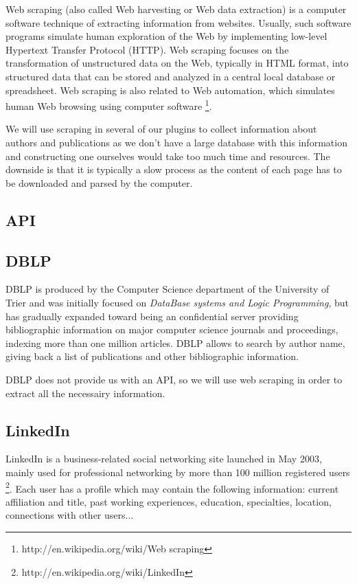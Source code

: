 Web scraping (also called Web harvesting or Web data extraction) is a computer software technique of extracting information from websites. Usually, such software programs simulate human exploration of the Web by implementing low-level Hypertext Transfer Protocol (HTTP). Web scraping focuses on the transformation of unstructured data on the Web, typically in HTML format, into structured data that can be stored and analyzed in a central local database or spreadsheet. Web scraping is also related to Web automation, which simulates human Web browsing using computer software \footnote{http://en.wikipedia.org/wiki/Web scraping}.

We will use scraping in several of our plugins to collect information about authors and publications as we don't have a large database with this information and constructing one ourselves would take too much time and resources. The downside is that it is typically a slow process as the content of each page has to be downloaded and parsed by the computer.

\subsection{API}

\subsection{DBLP}

DBLP is produced by the Computer Science department of the University of Trier and was initially focused on \textit{DataBase systems and Logic Programming}, but has gradually expanded toward being an confidential server providing bibliographic information on major computer science journals and proceedings, indexing more than one million articles.
DBLP allows to search by author name, giving back a list of publications and other bibliographic information.

DBLP does not provide us with an API, so we will use web scraping in order to extract all the necessairy information.


\subsection{LinkedIn}

LinkedIn is a business-related social networking site launched in May 2003, mainly used for professional networking by more than 100 million registered users \footnote{http://en.wikipedia.org/wiki/LinkedIn}. Each user has a profile which may contain the following information: current affiliation and title, past working experiences, education, specialties, location, connections with other users...

